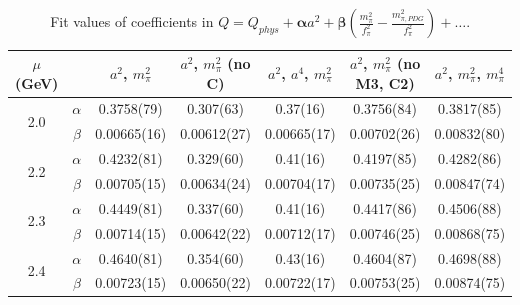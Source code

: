 \documentclass[12pt]{extarticle}
\begin{document}
\begin{table}[h!]
\begin{center}
\begin{tabular}{|c c|c|c|c|c|c|}
\hline
$\mu$ (GeV) &  & $a^2$, $m_\pi^2$& $a^2$, $m_\pi^2$ (no C)& $a^2$, $a^4$, $m_\pi^2$& $a^2$, $m_\pi^2$ (no M3, C2)& $a^2$, $m_\pi^2$, $m_\pi^4$\\
\hline
\multirow{2}{0.5in}{2.0} & $\alpha$ & 0.3758(79)& 0.307(63)& 0.37(16)& 0.3756(84)& 0.3817(85)\\
 & $\beta$ & 0.00665(16)& 0.00612(27)& 0.00665(17)& 0.00702(26)& 0.00832(80)\\
\hline
\multirow{2}{0.5in}{2.2} & $\alpha$ & 0.4232(81)& 0.329(60)& 0.41(16)& 0.4197(85)& 0.4282(86)\\
 & $\beta$ & 0.00705(15)& 0.00634(24)& 0.00704(17)& 0.00735(25)& 0.00847(74)\\
\hline
\multirow{2}{0.5in}{2.3} & $\alpha$ & 0.4449(81)& 0.337(60)& 0.41(16)& 0.4417(86)& 0.4506(88)\\
 & $\beta$ & 0.00714(15)& 0.00642(22)& 0.00712(17)& 0.00746(25)& 0.00868(75)\\
\hline
\multirow{2}{0.5in}{2.4} & $\alpha$ & 0.4640(81)& 0.354(60)& 0.43(16)& 0.4604(87)& 0.4698(88)\\
 & $\beta$ & 0.00723(15)& 0.00650(22)& 0.00722(17)& 0.00753(25)& 0.00874(75)\\
\hline
\end{tabular}
\caption{Fit values of coefficients in $Q = Q_{phys} + \mathbf{\alpha} a^2 + \mathbf{\beta}\left(\frac{m_\pi^2}{f_\pi^2}-\frac{m_{\pi,PDG}^2}{f_\pi^2}\right) + \ldots$.}
\end{center}
\end{table}




















\clearpage
\end{document}
